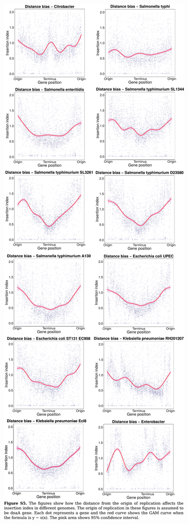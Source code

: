\documentclass{article}
\newcommand{\Newpage}{\end{preview}\begin{preview}}
\begin{document}
\begin{preview}
\Newpage
\includegraphics{suppl5.pdf}
\Newpage

\end{preview}
\end{document}
